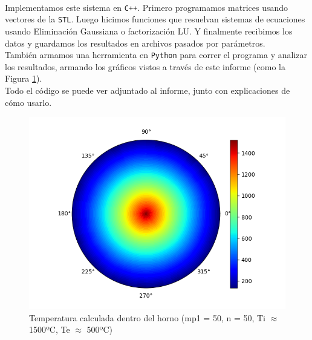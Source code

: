 \documentclass[12pt]{article}
\begin{document}
\paragraph{} Implementamos este sistema en \texttt{C++}. Primero programamos matrices usando vectores de la \texttt{STL}. Luego hicimos funciones que resuelvan sistemas de ecuaciones usando Eliminación Gaussiana o factorización LU. Y finalmente recibimos los datos y guardamos los resultados en archivos pasados por parámetros. \\
También armamos una herramienta en \texttt{Python} para correr el programa y analizar los resultados, armando los gráficos vistos a través de este informe (como la Figura \ref{fig:temperature}). \\
Todo el código se puede ver adjuntado al informe, junto con explicaciones de cómo usarlo. \\

\begin{figure}[H]
\centering
\includegraphics[scale=0.5]{complete.0.temperature}
\caption{Temperatura calculada dentro del horno (mp1 = 50, n = 50, Ti \(\approx\) 1500ºC, Te \(\approx\) 500ºC)}
\label{fig:temperature}
\end{figure}

\end{document}
